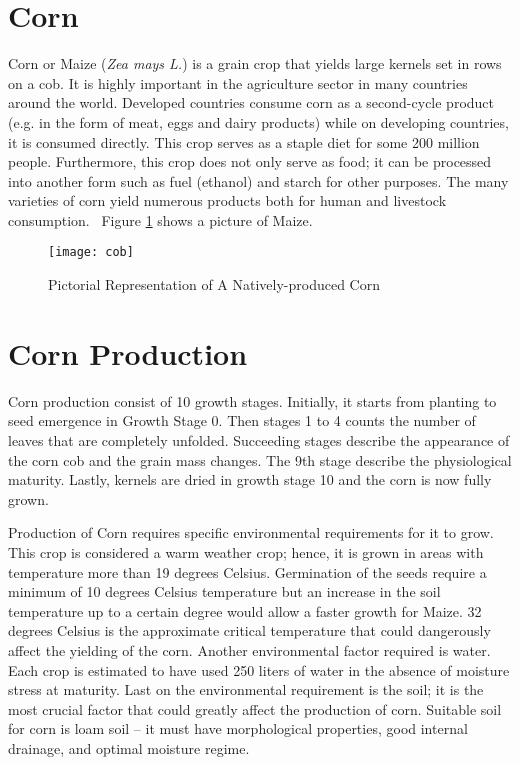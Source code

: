 \section{Corn}

Corn or Maize (\textit{Zea mays L.}) is a grain crop that yields large kernels set in rows on a cob. It is highly important in the agriculture sector in many countries around the world. Developed countries consume corn as a second-cycle product (e.g. in the form of meat, eggs and dairy products) while on developing countries, it is consumed directly. This crop serves as a staple diet for some 200 million people. Furthermore, this crop does not only serve as food; it can be processed into another form such as fuel (ethanol) and starch for other purposes. The many varieties of corn yield numerous products both for human and livestock consumption.~\cite{Jean2003} Figure \ref{fig:corn} shows a picture of Maize.

\begin{figure}[!htbp]
	\centering
		\texttt{[image: cob]}
	\caption{Pictorial Representation of A Natively-produced Corn}
	\label{fig:corn}
\end{figure}

\section{Corn Production}

	Corn production consist of 10 growth stages. Initially, it starts from planting to seed emergence in Growth Stage 0. Then stages 1 to 4 counts the number of leaves that are completely unfolded. Succeeding stages describe the appearance of the corn cob and the grain mass changes. The 9th stage describe the physiological maturity. Lastly, kernels are dried in growth stage 10 and the corn is now fully grown.

	Production of Corn requires specific environmental requirements for it to grow. This crop is considered a warm weather crop; hence, it is grown in areas with temperature more than 19 degrees Celsius. Germination of the seeds require a minimum of 10 degrees Celsius temperature but an increase in the soil temperature up to a certain degree would allow a faster growth for Maize. 32 degrees Celsius is the approximate critical temperature that could dangerously affect the yielding of the corn. Another environmental factor required is water. Each crop is estimated to have used 250 liters of water in the absence of moisture stress at maturity. Last on the environmental requirement is the soil; it is the most crucial factor that could greatly affect the production of corn. Suitable soil for corn is loam soil -- it must have morphological properties, good internal drainage, and optimal moisture regime.~\cite{Jean2003} 

